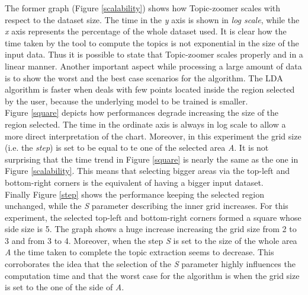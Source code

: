 \documentclass{sig-alternate-05-2015}
\begin{document}
The former graph (Figure \ref{scalability}) shows how Topic-zoomer scales with respect to the dataset size. The time in the \emph{y} axis is shown in \emph{log scale}, while the \emph{x} axis represents the percentage of the whole dataset used. It is clear how the time taken by the tool to compute the topics is not exponential in the size of the input data. Thus it is possible to state that Topic-zoomer scales properly and in a linear manner.  
Another important aspect while processing a large amount of data is to show the worst and the best case scenarios for the algorithm. The LDA algorithm is faster when deals with few points located inside the region selected by the user, because the underlying model to be trained is smaller.\\
Figure \ref{square} depicts how performances degrade increasing the size of the region selected. The time in the ordinate axis is always in log scale to allow a more direct interpretation of the chart. Moreover, in this experiment the grid size (i.e. the \emph{step}) is set to be equal to te one of the selected area \emph{A}. It is not surprising that the time trend in Figure \ref {square} is nearly the same as the one in Figure \ref{scalability}. This means that selecting bigger areas via the top-left and bottom-right corners is the equivalent of having a bigger input dataset.\\  
Finally Figure \ref{step} shows the performance keeping the selected region unchanged, while the \emph{S} parameter describing the inner grid increases. For this experiment, the selected top-left and bottom-right corners formed a square whose side size is 5. The graph shows a huge increase increasing the grid size from 2 to 3 and from 3 to 4. Moreover, when the step \emph{S} is set to the size of the whole area \emph{A} the time taken to complete the topic extraction seems to decrease. This corroborates the idea that the selection of the \emph{S} parameter highly influences the computation time and that the worst case for the algorithm is when the grid size is set to the one of the side of \emph{A}.
\end{document}
